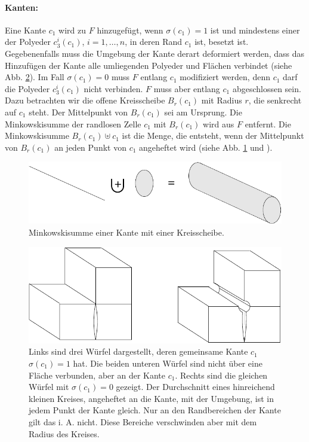 \paragraph{Kanten:} Eine Kante $c_1$ wird zu $F$ hinzugef\"ugt, wenn $\sigma(c_1)=1$ ist und mindestens einer der Polyeder $c_3^i(c_1)$, $i=1,\ldots,n$, in deren Rand $c_1$ ist, besetzt ist. Gegebenenfalls muss die Umgebung der Kante derart deformiert werden, dass das Hinzuf\"ugen der Kante alle umliegenden Polyeder und Fl\"achen verbindet (siehe Abb. \ref{fig:kante3d}). Im Fall $\sigma(c_1)=0$ muss $F$ entlang $c_1$ modifiziert werden, denn $c_1$ darf die Polyeder $c_3^i(c_1)$ nicht verbinden. $F$ muss aber entlang $c_1$ abgeschlossen sein. Dazu betrachten wir die offene Kreisscheibe $B_r(c_1)$ mit Radius $r$, die senkrecht auf $c_1$ steht. Der Mittelpunkt von $B_r(c_1)$ sei am Ursprung. Die Minkowskisumme der randlosen Zelle $c_1$ mit $B_r(c_1)$ wird aus $F$ entfernt. Die Minkowskisumme $B_r(c_1)\uplus c_1$ ist die Menge, die entsteht, wenn der Mittelpunkt von $B_r(c_1)$ an jeden Punkt von $c_1$ angeheftet wird (siehe Abb. \ref{fig:minkowski} und \cite{Mecke:94}). 
\begin{figure}[bt]
  \centering
  \includegraphics{./Mixed-figs/minkowski}
  \caption{Minkowskisumme einer Kante mit einer Kreisscheibe.}
  \label{fig:minkowski}
\end{figure}
\begin{figure}[bt]
  \centering
  \includegraphics{./Mixed-figs/kante3d}
  \caption{Links sind drei W\"urfel dargestellt, deren gemeinsame Kante $c_1$ $\sigma(c_1)=1$ hat. Die beiden unteren W\"urfel sind nicht \"uber eine Fl\"ache verbunden, aber an der Kante $c_1$. Rechts sind die gleichen W\"urfel mit $\sigma(c_1)=0$ gezeigt. Der Durchschnitt eines hinreichend kleinen Kreises, angeheftet an die Kante, mit der Umgebung, ist in jedem Punkt der Kante gleich. Nur an den Randbereichen der Kante gilt das i. A. nicht. Diese Bereiche verschwinden aber mit dem Radius des Kreises. }
  \label{fig:kante3d}
\end{figure}

